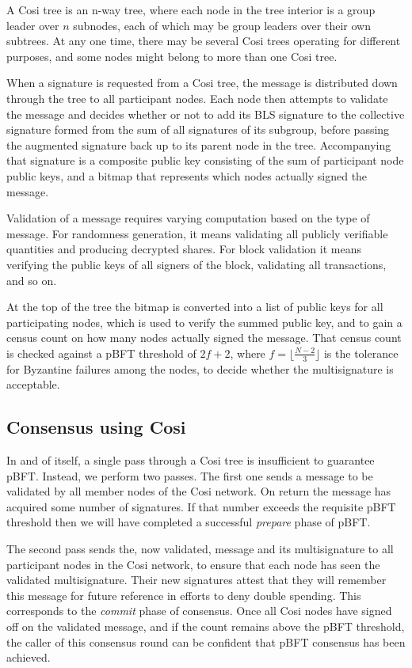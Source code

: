 \documentclass{yellowpaper}
\begin{document}
A Cosi tree is an n-way tree, where each node in the tree interior is a group leader over $n$ subnodes, each of which may be group leaders over their own subtrees. At any one time, there may be several Cosi trees operating for different purposes, and some nodes might belong to more than one Cosi tree.

When a signature is requested from a Cosi tree, the message is distributed down through the tree to all participant nodes. Each node then attempts to validate the message and decides whether or not to add its BLS signature to the collective signature formed from the sum of all signatures of its subgroup, before passing the augmented signature back up to its parent node in the tree. Accompanying that signature is a composite public key consisting of the sum of participant node public keys, and a bitmap that represents which nodes actually signed the message.

Validation of a message requires varying computation based on the type of message. For randomness generation, it means validating all publicly verifiable quantities and producing decrypted shares. For block validation it means verifying the public keys of all signers of the block, validating all transactions, and so on.

At the top of the tree the bitmap is converted into a list of public keys for all participating nodes, which is used to verify the summed public key, and to gain a census count on how many nodes actually signed the message. That census count is checked against a pBFT threshold of $2 f+ 2$, where $f = \lfloor \frac{N-2}{3} \rfloor$ is the tolerance for Byzantine failures among the nodes, to decide whether the multisignature is acceptable. 
\subsection{Consensus using Cosi}
In and of itself, a single pass through a Cosi tree is insufficient to guarantee pBFT. Instead, we perform two passes. The first one sends a message to be validated by all member nodes of the Cosi network. On return the message has acquired some number of signatures. If that number exceeds the requisite pBFT threshold then we will have completed a successful {\em{prepare}} phase of pBFT.

The second pass sends the, now validated, message and its multisignature to all participant nodes in the Cosi network, to ensure that each node has seen the validated multisignature. Their new signatures attest that they will remember this message for future reference in efforts to deny double spending. This corresponds to the {\em{commit}} phase of consensus. Once all Cosi nodes have signed off on the validated message, and if the count remains above the pBFT threshold, the caller of this consensus round can be confident that pBFT consensus has been achieved.
\end{document}
